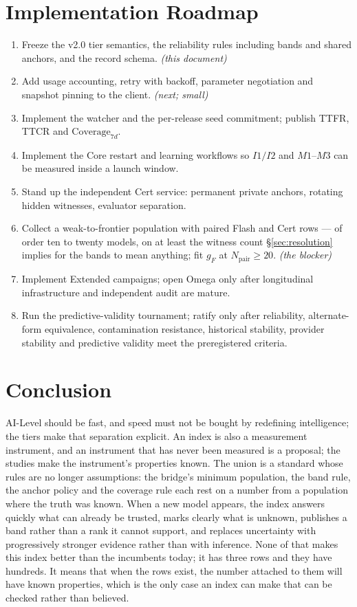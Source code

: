 \section{Implementation Roadmap}\label{sec:roadmap}

\begin{enumerate}[leftmargin=1.6em,itemsep=1pt]
\item Freeze the v2.0 tier semantics, the reliability rules including bands and shared anchors, and the record schema. \emph{(this document)}
\item Add usage accounting, retry with backoff, parameter negotiation and snapshot pinning to the client. \emph{(next; small)}
\item Implement the watcher and the per-release seed commitment; publish TTFR, TTCR and $\mathrm{Coverage}_{7d}$.
\item Implement the Core restart and learning workflows so $I1/I2$ and $M1$--$M3$ can be measured inside a launch window.
\item Stand up the independent Cert service: permanent private anchors, rotating hidden witnesses, evaluator separation.
\item Collect a weak-to-frontier population with paired Flash and Cert rows --- of order ten to twenty models, on at least the witness count \S\ref{sec:resolution} implies for the bands to mean anything; fit $g_F$ at $N_{\text{pair}} \ge 20$. \emph{(the blocker)}
\item Implement Extended campaigns; open Omega only after longitudinal infrastructure and independent audit are mature.
\item Run the predictive-validity tournament; ratify only after reliability, alternate-form equivalence, contamination resistance, historical stability, provider stability and predictive validity meet the preregistered criteria.
\end{enumerate}

\section{Conclusion}\label{sec:conclusion}

AI-Level should be fast, and speed must not be bought by redefining intelligence; the tiers make that separation explicit. An index is also a measurement instrument, and an instrument that has never been measured is a proposal; the studies make the instrument's properties known. The union is a standard whose rules are no longer assumptions: the bridge's minimum population, the band rule, the anchor policy and the coverage rule each rest on a number from a population where the truth was known. When a new model appears, the index answers quickly what can already be trusted, marks clearly what is unknown, publishes a band rather than a rank it cannot support, and replaces uncertainty with progressively stronger evidence rather than with inference. None of that makes this index better than the incumbents today; it has three rows and they have hundreds. It means that when the rows exist, the number attached to them will have known properties, which is the only case an index can make that can be checked rather than believed.

